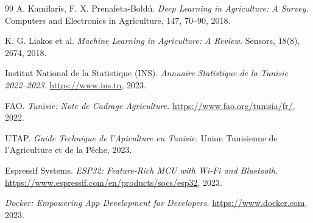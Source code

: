 \documentclass[12pt,a4paper,oneside]{report}
\begin{document}
\begin{thebibliography}{99}
A. Kamilaris, F. X. Prenafeta-Boldú.
\textit{Deep Learning in Agriculture: A Survey.}
Computers and Electronics in Agriculture, 147, 70--90, 2018.

K. G. Liakos et al.
\textit{Machine Learning in Agriculture: A Review.}
Sensors, 18(8), 2674, 2018.

Institut National de la Statistique (INS).
\textit{Annuaire Statistique de la Tunisie 2022--2023.}
\url{https://www.ins.tn}, 2023.

FAO.
\textit{Tunisie: Note de Cadrage Agriculture.}
\url{https://www.fao.org/tunisia/fr/}, 2022.

UTAP.
\textit{Guide Technique de l'Apiculture en Tunisie.}
Union Tunisienne de l'Agriculture et de la Pêche, 2023.

Espressif Systems.
\textit{ESP32: Feature-Rich MCU with Wi-Fi and Bluetooth.}
\url{https://www.espressif.com/en/products/socs/esp32}, 2023.

\textit{Docker: Empowering App Development for Developers.}
\url{https://www.docker.com}, 2023.

\end{thebibliography}
\end{document}
